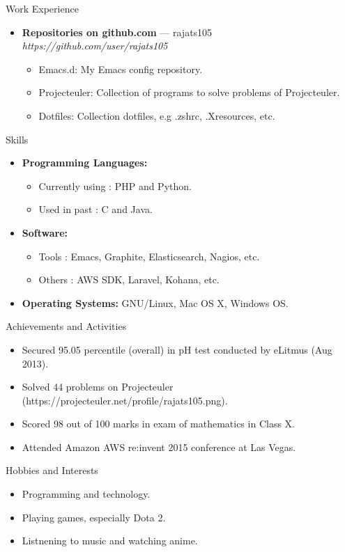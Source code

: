 \documentclass[a4paper,11pt,oneside]{article}
\newenvironment{ressection}[1]{
  \vspace{4pt}
         {\fontfamily{phv}\selectfont\Large#1}
         \begin{itemize}
           \vspace{3pt}
}{
         \end{itemize}
}
\newcommand{\resitem}[1]{
  \vspace{-4pt}
\item \begin{flushleft} #1 \end{flushleft}
}
\newcommand{\ressubitem}[1]{
  \vspace{-1pt}
\item \begin{flushleft} #1 \end{flushleft}
}
\newcommand{\resbigitem}[3]{
  \vspace{-5pt}
\item
  \textbf{#1} --- #2 \\
  \textit{#3}
}
\newenvironment{ressubsec}[3]{
  \resbigitem{#1}{#2}{#3}
  \vspace{-2pt}
  \begin{itemize}
}{
  \end{itemize}
}
\newenvironment{reslist}[1]{
  \resitem{\textbf{#1}}
  \vspace{-5pt}
  \begin{itemize}
}{
  \end{itemize}
}
\begin{document}
\begin{ressection}{Work Experience}
  \begin{ressubsec}{Repositories on github.com}{rajats105}{https://github.com/user/rajats105}
    \ressubitem{Emacs.d: My Emacs config repository.}
    \ressubitem{Projecteuler: Collection of programs to solve problems of Projecteuler.}
    \ressubitem{Dotfiles: Collection dotfiles, e.g .zshrc, .Xresources, etc.}
  \end{ressubsec}
\end{ressection}


\begin{ressection}{Skills}
  \begin{reslist}{Programming Languages:}
    \ressubitem{Currently using : PHP and Python.}
    \ressubitem{Used in past : C and Java.}
  \end{reslist}
  \begin{reslist}{Software:}
    \ressubitem{Tools : Emacs, Graphite, Elasticsearch, Nagios, etc.}
    \ressubitem{Others : AWS SDK, Laravel, Kohana, etc.}
  \end{reslist}
    \resitem{\textbf{Operating Systems:} GNU/Linux, Mac OS X, Windows OS.}
\end{ressection}


\begin{ressection}{Achievements and Activities}
  \resitem{Secured 95.05 percentile (overall) in pH test conducted by eLitmus (Aug 2013).}
  \resitem{Solved 44 problems on Projecteuler (https://projecteuler.net/profile/rajats105.png).}
  \resitem{Scored 98 out of 100 marks in exam of mathematics in Class X.}
  \resitem{Attended Amazon AWS re:invent 2015 conference at Las Vegas.}
\end{ressection}


\begin{ressection}{Hobbies and Interests}
  \resitem{Programming and technology.}
  \resitem{Playing games, especially Dota 2.}
  \resitem{Listnening to music and watching anime.}
\end{ressection}
\end{document}
